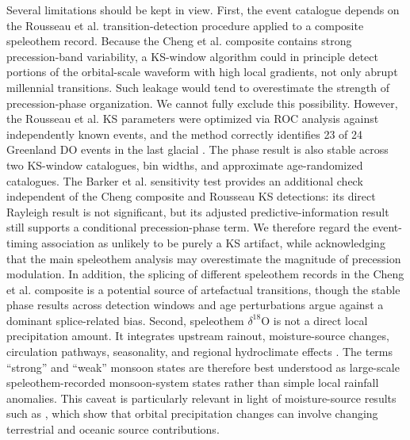 \documentclass[11pt]{article}
\begin{document}
Several limitations should be kept in view. First, the event catalogue depends on the Rousseau et al. transition-detection procedure applied to a composite speleothem record. Because the Cheng et al. composite contains strong precession-band variability, a KS-window algorithm could in principle detect portions of the orbital-scale waveform with high local gradients, not only abrupt millennial transitions. Such leakage would tend to overestimate the strength of precession-phase organization. We cannot fully exclude this possibility. However, the Rousseau et al. KS parameters were optimized via ROC analysis against independently known events, and the method correctly identifies 23 of 24 Greenland DO events in the last glacial \citep{rousseau2023reliable}. The phase result is also stable across two KS-window catalogues, bin widths, and approximate age-randomized catalogues. The Barker et al. sensitivity test provides an additional check independent of the Cheng composite and Rousseau KS detections: its direct Rayleigh result is not significant, but its adjusted predictive-information result still supports a conditional precession-phase term. We therefore regard the event-timing association as unlikely to be purely a KS artifact, while acknowledging that the main speleothem analysis may overestimate the magnitude of precession modulation. In addition, the splicing of different speleothem records in the Cheng et al. composite is a potential source of artefactual transitions, though the stable phase results across detection windows and age perturbations argue against a dominant splice-related bias. Second, speleothem \(\delta^{18}\mathrm{O}\) is not a direct local precipitation amount. It integrates upstream rainout, moisture-source changes, circulation pathways, seasonality, and regional hydroclimate effects \citep{liu2014chinese, cheng2021orbital, zheng2022decoupled}. The terms ``strong'' and ``weak'' monsoon states are therefore best understood as large-scale speleothem-recorded monsoon-system states rather than simple local rainfall anomalies. This caveat is particularly relevant in light of moisture-source results such as \citet{xie2023contributions}, which show that orbital precipitation changes can involve changing terrestrial and oceanic source contributions.
\end{document}

